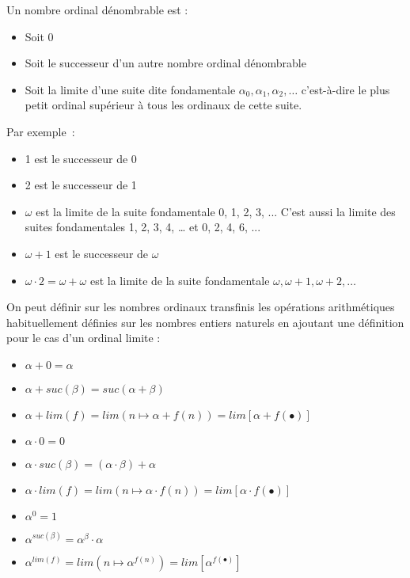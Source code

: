 \documentclass[12pt]{beamer}
\begin{document}
\begin{frame}

Un nombre ordinal dénombrable est :
\begin{itemize}
\item Soit 0
\item Soit le successeur d'un autre nombre ordinal dénombrable
\item Soit la limite d'une suite dite fondamentale \( \alpha_0, \alpha_1, \alpha_2, \ldots \) c'est-à-dire le plus petit ordinal supérieur à tous les ordinaux de cette suite.
\end{itemize}
Par exemple :
\begin{itemize}
\item 1 est le successeur de 0
\item 2 est le successeur de 1
\item \( \omega \) est la limite de la suite fondamentale 0, 1, 2, 3, ...
C'est aussi la limite des suites fondamentales 1, 2, 3, 4, … et 0, 2, 4, 6, ...
\item \( \omega+1 \) est le successeur de \( \omega \)
\item \( \omega \cdot 2 = \omega + \omega \) est la limite de la suite fondamentale \( \omega, \omega+1, \omega+2, \ldots \)
\end{itemize}

\end{frame}
\begin{frame}

On peut définir sur les nombres ordinaux transfinis les opérations arithmétiques habituellement définies sur les nombres entiers naturels en ajoutant une définition pour le cas d'un ordinal limite :


\begin{itemize}
     \setlength{\itemsep}{1pt}
     \setlength{\parskip}{0pt}
     \setlength{\parsep}{0pt}

\item \( \alpha+0=\alpha \)
\item \( \alpha+suc(\beta)=suc(\alpha+\beta) \)
\item \( \alpha+lim(f)=lim(n \mapsto \alpha+f(n)) = lim [\alpha+f(\bullet)] \)

\bigskip

\item \( \alpha \cdot 0 = 0 \)
\item \( \alpha \cdot suc(\beta) = (\alpha \cdot \beta) + \alpha \)
\item \( \alpha \cdot lim(f) = lim (n \mapsto \alpha \cdot f(n)) = lim [\alpha \cdot f(\bullet)] \)

\bigskip

\item \( \alpha^0 = 1 \)
\item \( \alpha^{suc(\beta)} = \alpha^\beta \cdot \alpha \)
\item \( \alpha^{lim(f)} = lim (n \mapsto \alpha^{f(n)}) = lim [\alpha^{f(\bullet)}] \)

\end{itemize}

\end{frame}
\end{document}
